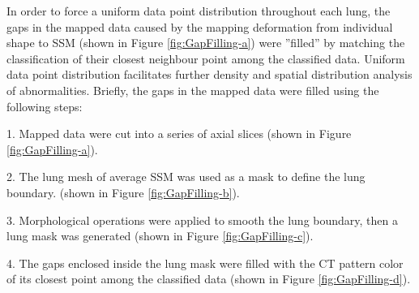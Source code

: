 In order to force a uniform data point distribution throughout each lung, the gaps in the mapped data caused by the mapping deformation from individual shape to SSM (shown in Figure \ref{fig:GapFilling-a}) were ''filled'' by matching the classification of their closest neighbour point among the classified data. Uniform data point distribution facilitates further density and spatial distribution analysis of abnormalities. Briefly, the gaps in the mapped data were filled using the following steps: 

1. Mapped data were cut into a series of axial slices (shown in Figure \ref{fig:GapFilling-a}).

2. The lung mesh of average SSM was used as a mask to define the lung boundary. (shown in Figure \ref{fig:GapFilling-b}).

3. Morphological operations were applied to smooth the lung boundary, then a lung mask was generated (shown in Figure \ref{fig:GapFilling-c}).

4. The gaps enclosed inside the lung mask were filled with the CT pattern color of its closest point among the classified data (shown in Figure \ref{fig:GapFilling-d}).

